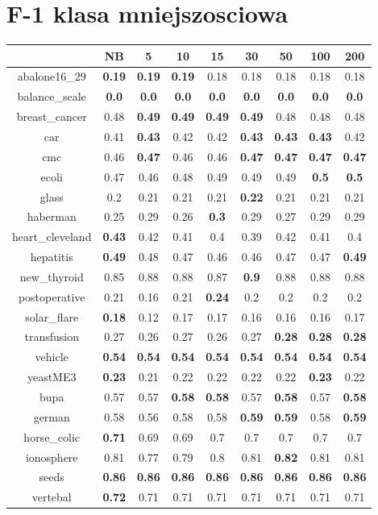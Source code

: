 \documentclass{article}%
\begin{document}
%
\section*{F{-}1 klasa mniejszosciowa}%
\begin{tabular}{c|cccccccc}%
\hline%
&NB&5&10&15&30&50&100&200\\%
\hline%
abalone16\_29&\textbf{0.19}&\textbf{0.19}&\textbf{0.19}&0.18&0.18&0.18&0.18&0.18\\%
\hline%
balance\_scale&\textbf{0.0}&\textbf{0.0}&\textbf{0.0}&\textbf{0.0}&\textbf{0.0}&\textbf{0.0}&\textbf{0.0}&\textbf{0.0}\\%
\hline%
breast\_cancer&0.48&\textbf{0.49}&\textbf{0.49}&\textbf{0.49}&\textbf{0.49}&0.48&0.48&0.48\\%
\hline%
car&0.41&\textbf{0.43}&0.42&0.42&\textbf{0.43}&\textbf{0.43}&\textbf{0.43}&0.42\\%
\hline%
cmc&0.46&\textbf{0.47}&0.46&0.46&\textbf{0.47}&\textbf{0.47}&\textbf{0.47}&\textbf{0.47}\\%
\hline%
ecoli&0.47&0.46&0.48&0.49&0.49&0.49&\textbf{0.5}&\textbf{0.5}\\%
\hline%
glass&0.2&0.21&0.21&0.21&\textbf{0.22}&0.21&0.21&0.21\\%
\hline%
haberman&0.25&0.29&0.26&\textbf{0.3}&0.29&0.27&0.29&0.29\\%
\hline%
heart\_cleveland&\textbf{0.43}&0.42&0.41&0.4&0.39&0.42&0.41&0.4\\%
\hline%
hepatitis&\textbf{0.49}&0.48&0.47&0.46&0.46&0.47&0.47&\textbf{0.49}\\%
\hline%
new\_thyroid&0.85&0.88&0.88&0.87&\textbf{0.9}&0.88&0.88&0.88\\%
\hline%
postoperative&0.21&0.16&0.21&\textbf{0.24}&0.2&0.2&0.2&0.2\\%
\hline%
solar\_flare&\textbf{0.18}&0.12&0.17&0.17&0.16&0.16&0.16&0.17\\%
\hline%
transfusion&0.27&0.26&0.27&0.26&0.27&\textbf{0.28}&\textbf{0.28}&\textbf{0.28}\\%
\hline%
vehicle&\textbf{0.54}&\textbf{0.54}&\textbf{0.54}&\textbf{0.54}&\textbf{0.54}&\textbf{0.54}&\textbf{0.54}&\textbf{0.54}\\%
\hline%
yeastME3&\textbf{0.23}&0.21&0.22&0.22&0.22&0.22&\textbf{0.23}&0.22\\%
\hline%
bupa&0.57&0.57&\textbf{0.58}&\textbf{0.58}&0.57&\textbf{0.58}&0.57&\textbf{0.58}\\%
\hline%
german&0.58&0.56&0.58&0.58&\textbf{0.59}&\textbf{0.59}&0.58&\textbf{0.59}\\%
\hline%
horse\_colic&\textbf{0.71}&0.69&0.69&0.7&0.7&0.7&0.7&0.7\\%
\hline%
ionosphere&0.81&0.77&0.79&0.8&0.81&\textbf{0.82}&0.81&0.81\\%
\hline%
seeds&\textbf{0.86}&\textbf{0.86}&\textbf{0.86}&\textbf{0.86}&\textbf{0.86}&\textbf{0.86}&\textbf{0.86}&\textbf{0.86}\\%
\hline%
vertebal&\textbf{0.72}&0.71&0.71&0.71&0.71&0.71&0.71&0.71\\%
\hline%
\end{tabular}
\end{document}
